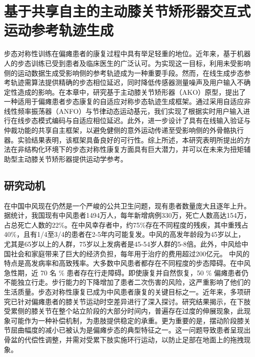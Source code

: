 \chapter{基于共享自主的主动膝关节矫形器交互式运动参考轨迹生成}
步态对称性训练在偏瘫患者的康复过程中具有举足轻重的地位。近年来，基于机器人的步态训练已受到患者及临床医生的广泛认可。为实现这一目标，利用未受影响侧的运动数据生成受影响侧的参考轨迹成为一种重要手段。然而，在线生成步态参考轨迹需算法提供精确的步态相位延迟，同时降低传感器测量噪声及用户输入不确定性造成的影响。在本章中，研究基于主动膝关节矫形器（AKO）原型，提出了一种适用于偏瘫患者步态康复的自适应对称步态轨迹生成框架。通过采用自适应非线性频率振荡器（ANFO）与节律动态运动基元，我们实现了根据实时用户输入进行在线步态模式编码与自适应相位延迟。此外，进一步设计了具有在线输入验证与仲裁功能的共享自主框架，以避免健侧的意外运动传递至受影响侧的外骨骼执行器。实验结果表明，该框架具备良好的可行性。综上所述，本研究表明所提出的方法在非结构化环境下的步态对称性康复方面具有巨大潜力，并可以在未来为扭矩辅助型主动膝关节矫形器提供运动学参考。
\section{研究动机}
在中国中风现在仍然是一个严峻的公共卫生问题，现有患者数量庞大且逐年上升。据统计，我国现有中风患者1494万人，每年新增病例330万，死亡人数高达154万，占总死亡人数的22\%。在中风幸存者中，约75\%存在不同程度的残疾，其中重残占40\%，且有1/4至3/4的患者在2-5年内可能复发。中风的高发年龄段为45岁以上，尤其是65岁以上的人群，75岁以上发病者是45-54岁人群的5-8倍。此外，中风给中国社会和家庭带来了巨大的经济负担，每年用于治疗的费用超过200亿元。
中风的特点是高发病率和高致残率。大多数中风患者都存在不同程度的步态障碍。在中风急性期，近 70 名 \% 患者存在行走障碍。即使康复并自然恢复，50 \% 偏瘫患者仍不能独立行走\cite{jorgensenRecoveryWalkingFunction1995}。步行能力的下降增加了患者二次伤害的风险，这严重影响了他们的生活质量\cite{balabanGaitDisturbancesPatients2014,yelnikClinicalGuideAssess1999}。步态对称性康复已成为中风患者康复的关键目标之一。近年来，多项研究已针对偏瘫患者的膝关节运动时空差异进行了深入探讨。研究结果揭示，在下肢受累侧的膝关节在整个站立阶段的大部分时间内，普遍存在过度的伸展现象\cite{woolleyCharacteristicsGaitHemiplegia2015}，此现象可能作为一种补偿机制，为患肢提供稳定的承重。更为重要的是，摆动阶段膝关节屈曲幅度的减小已被认为是偏瘫步态的典型特征之一\cite{lucareliALTERATIONLOADRESPONSEMECHANISM2006,campaniniMethodDifferentiateCauses2013}。这一问题导致患者呈现出骨盆的代偿性调整，并需对受累下肢实施环行运动，以防止足部在地面上的拖拽现象\cite{cruzBiomechanicalImpairmentsGait2009}。



